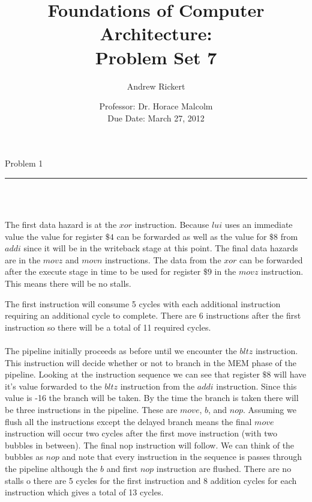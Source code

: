 \documentclass[11pt,reqno]{article}
\title{Foundations of Computer Architecture: \\ Problem Set 7 }
\author{Andrew Rickert}
\date{Professor: Dr. Horace Malcolm \\ \hspace{-33pt} Due Date: March 27,  2012}                                           %
\begin{document}
\maketitle


\begin{flushleft} 
Problem 1 \\
\rule{500pt}{1pt}\\
\end{flushleft} 


\noindent{}\\ 

The first data hazard is at the $xor$ instruction. Because $lui$ uses an immediate value the value for register $\$4$ can be forwarded as well as the value for $\$8$ from $addi$ since it will be in the writeback stage at this point. The final data hazards are in the $movz$ and $movn$ instructions. The data from the $xor$ can be forwarded after the execute stage in time to be used for register $\$9$ in the $movz$ instruction. This means there will be no stalls.

The first instruction will consume 5 cycles with each additional instruction requiring an additional cycle to complete. There are 6 instructions after the first instruction so there will be a total of 11 required cycles.\\

\noindent{}\\ 

The pipeline initially proceeds as before until we encounter the $bltz$ instruction. This instruction will decide whether or not to branch in the MEM phase of the pipeline. Looking at the instruction sequence we can see that register $\$8$ will have it's value forwarded to the $bltz$ instruction from the $addi$ instruction. Since this value is -16 the branch will be taken.
By the time the branch is taken there will be three instructions in the pipeline. These are $move$, $b$, and $nop$. Assuming we flush all the instructions except the delayed branch means the final $move$ instruction will occur two cycles after the first move instruction (with two bubbles in between). The final nop instruction will follow.
We can think of the bubbles as $nop$ and note that every instruction in the sequence is passes through the pipeline although the $b$ and first $nop$ instruction are flushed. There are no stalls o there are 5 cycles for the first instruction and 8 addition cycles for each instruction which gives a total of 13 cycles.\\
\end{document}
